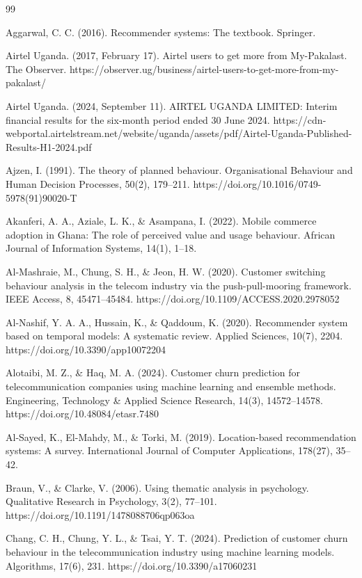 \begin{thebibliography}{99}

Aggarwal, C. C. (2016). Recommender systems: The textbook. Springer.

Airtel Uganda. (2017, February 17). Airtel users to get more from My-Pakalast. The Observer. https://observer.ug/business/airtel-users-to-get-more-from-my-pakalast/

Airtel Uganda. (2024, September 11). AIRTEL UGANDA LIMITED: Interim financial results for the six-month period ended 30 June 2024. https://cdn-webportal.airtelstream.net/website/uganda/assets/pdf/Airtel-Uganda-Published-Results-H1-2024.pdf

Ajzen, I. (1991). The theory of planned behaviour. Organisational Behaviour and Human Decision Processes, 50(2), 179--211. https://doi.org/10.1016/0749-5978(91)90020-T

Akanferi, A. A., Aziale, L. K., \& Asampana, I. (2022). Mobile commerce adoption in Ghana: The role of perceived value and usage behaviour. African Journal of Information Systems, 14(1), 1--18.

Al-Mashraie, M., Chung, S. H., \& Jeon, H. W. (2020). Customer switching behaviour analysis in the telecom industry via the push-pull-mooring framework. IEEE Access, 8, 45471--45484. https://doi.org/10.1109/ACCESS.2020.2978052

Al-Nashif, Y. A. A., Hussain, K., \& Qaddoum, K. (2020). Recommender system based on temporal models: A systematic review. Applied Sciences, 10(7), 2204. https://doi.org/10.3390/app10072204

Alotaibi, M. Z., \& Haq, M. A. (2024). Customer churn prediction for telecommunication companies using machine learning and ensemble methods. Engineering, Technology \& Applied Science Research, 14(3), 14572--14578. https://doi.org/10.48084/etasr.7480

Al-Sayed, K., El-Mahdy, M., \& Torki, M. (2019). Location-based recommendation systems: A survey. International Journal of Computer Applications, 178(27), 35--42.

Braun, V., \& Clarke, V. (2006). Using thematic analysis in psychology. Qualitative Research in Psychology, 3(2), 77--101. https://doi.org/10.1191/1478088706qp063oa

Chang, C. H., Chung, Y. L., \& Tsai, Y. T. (2024). Prediction of customer churn behaviour in the telecommunication industry using machine learning models. Algorithms, 17(6), 231. https://doi.org/10.3390/a17060231


\end{thebibliography}
